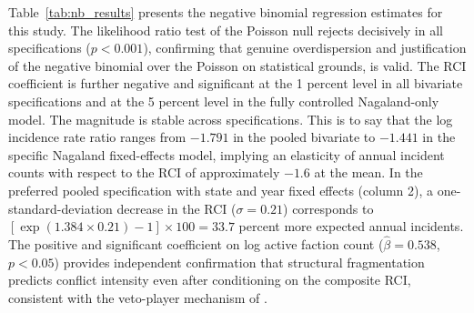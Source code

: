 \documentclass[12pt,a4paper]{article}
\begin{document}
Table~\ref{tab:nb_results} presents the negative binomial regression estimates for this study. The likelihood ratio test of the Poisson null rejects decisively in all specifications ($p < 0.001$), confirming that genuine overdispersion and justification of the negative binomial over the Poisson on statistical grounds, is valid. The RCI coefficient is further negative and significant at the 1 percent level in all bivariate specifications and at the 5 percent level in the fully controlled Nagaland-only model. The magnitude is stable across specifications. This is to say that the log incidence rate ratio ranges from $-1.791$ in the pooled bivariate to $-1.441$ in the specific Nagaland fixed-effects model, implying an elasticity of annual incident counts with respect to the RCI of approximately $-1.6$ at the mean. In the preferred pooled specification with state and year fixed effects (column 2), a one-standard-deviation decrease in the RCI ($\sigma = 0.21$) corresponds to $[\exp(1.384 \times 0.21)-1]\times 100 = 33.7$ percent more expected annual incidents. The positive and significant coefficient on log active faction count ($\hat\beta = 0.538$, $p < 0.05$) provides independent confirmation that structural fragmentation predicts conflict intensity even after conditioning on the composite RCI, consistent with the veto-player mechanism of \citet{cunningham2006,cunningham2009}.
\end{document}
